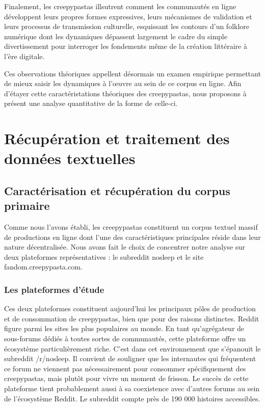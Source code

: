 \documentclass[12pt,a4paper,oneside,titlepage]{book} %
\begin{document}
Finalement, les creepypastas illsutrent comment les communautés en ligne développent leurs propres formes expressives, leurs mécanismes de validation et leurs processus de transmission culturelle, esquissant les contours d'un folklore numérique dont les dynamiques dépassent largement le cadre du simple divertissement pour interroger les fondements même de la création littéraire à l'ère digitale.

Ces observations théoriques appellent désormais un examen empirique permettant de mieux saisir les dynamiques à l’œuvre au sein de ce corpus en ligne. Afin d’étayer cette caractéristations théoriques des creepypastas, nous proposons à présent une analyse quantitative de la forme de celle-ci.




\part{Récupération et traitement des données textuelles}

\chapter{Caractérisation et récupération du corpus primaire}
    
Comme nous l'avons établi, les creepypastas constituent un corpus textuel massif de productions en ligne dont l'une des caractéristiques principales réside dans leur nature décentralisée. Nous avons fait le choix de concentrer notre analyse sur deux plateformes représentatives : le subreddit nosleep et le site fandom.creepypasta.com.

\section{Les plateformes d'étude}
Ces deux plateformes constituent aujourd'hui les principaux pôles de production et de consommation de creepypastas, bien que pour des raisons distinctes.
Reddit figure parmi les sites les plus populaires au monde. En tant qu'agrégateur de sous-forums dédiés à toutes sortes de communautés, cette plateforme offre un écosystème particulièrement riche. C'est dans cet environnement que s'épanouit le subreddit /r/nosleep. Il convient de souligner que les internautes qui fréquentent ce forum ne viennent pas nécessairement pour consommer spécifiquement des creepypastas, mais plutôt pour vivre un moment de frisson. Le succès de cette plateforme tient probablement aussi à sa coexistence avec d'autres forums au sein de l'écosystème Reddit. Le subreddit compte près de 190 000 histoires accessibles.
\end{document}
